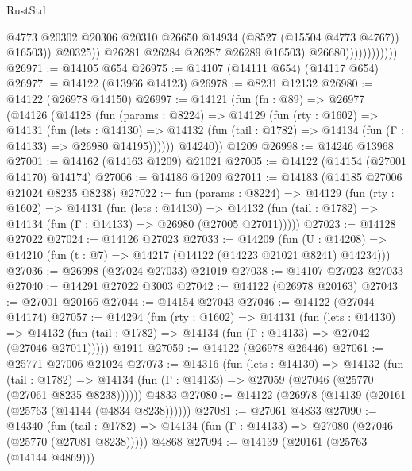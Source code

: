 \begin{lexlean}{RustStd}
\begin{coremodule}
                                      @4773
                                      @20302
                                      @20306
                                      @20310
                                      @26650
                                      @14934
                                      (@8527 (@15504 @4773 @4767))
                                      @16503))
                                  @20325))
                              @26281
                              @26284
                              @26287
                              @26289
                              @16503)
                            @26680))))))))))))
@26971 := @14105 @654
@26975 := @14107 (@14111 @654) (@14117 @654)
@26977 := @14122 (@13966 @14123)
@26978 := @8231 @12132
@26980 := @14122 (@26978 @14150)
@26997 := @14121
    (fun (fn : @89) =>
    @26977
      (@14126
        (@14128
          (fun (params : @8224) =>
          @14129
            (fun (rty : @1602) =>
            @14131
              (fun (lets : @14130) =>
              @14132 (fun (tail : @1782) => @14134 (fun (Γ : @14133) => @26980 @14195))))))
        @14240))
    @1209
@26998 := @14246 @13968
@27001 := @14162 (@14163 @1209) @21021
@27005 := @14122 (@14154 (@27001 @14170) @14174)
@27006 := @14186 @1209
@27011 := @14183 (@14185 @27006 @21024 @8235 @8238)
@27022 := fun (params : @8224) =>
  @14129
    (fun (rty : @1602) =>
    @14131
      (fun (lets : @14130) =>
      @14132 (fun (tail : @1782) => @14134 (fun (Γ : @14133) => @26980 (@27005 @27011)))))
@27023 := @14128 @27022
@27024 := @14126 @27023
@27033 := @14209
    (fun (U : @14208) => @14210 (fun (t : @7) => @14217 (@14122 (@14223 @21021 @8241) @14234)))
@27036 := @26998 (@27024 @27033) @21019
@27038 := @14107 @27023 @27033
@27040 := @14291 @27022 @3003
@27042 := @14122 (@26978 @20163)
@27043 := @27001 @20166
@27044 := @14154 @27043
@27046 := @14122 (@27044 @14174)
@27057 := @14294
    (fun (rty : @1602) =>
    @14131
      (fun (lets : @14130) =>
      @14132 (fun (tail : @1782) => @14134 (fun (Γ : @14133) => @27042 (@27046 @27011)))))
    @1911
@27059 := @14122 (@26978 @26446)
@27061 := @25771 @27006 @21024
@27073 := @14316
    (fun (lets : @14130) =>
    @14132
      (fun (tail : @1782) =>
      @14134 (fun (Γ : @14133) => @27059 (@27046 (@25770 (@27061 @8235 @8238))))))
    @4833
@27080 := @14122 (@26978 (@14139 (@20161 (@25763 (@14144 (@4834 @8238))))))
@27081 := @27061 @4833
@27090 := @14340
    (fun (tail : @1782) => @14134 (fun (Γ : @14133) => @27080 (@27046 (@25770 (@27081 @8238)))))
    @4868
@27094 := @14139 (@20161 (@25763 (@14144 @4869)))

\end{coremodule}
\end{lexlean}
